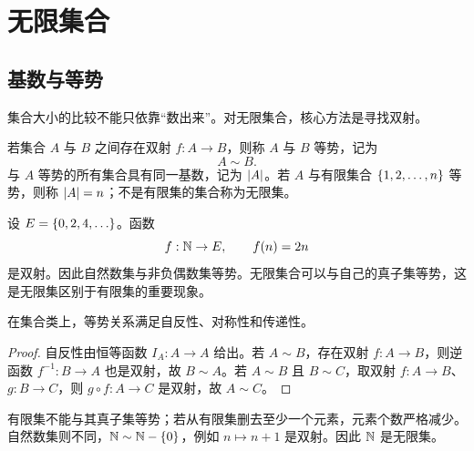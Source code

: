%
%

\chapter{无限集合}

\section{基数与等势}

集合大小的比较不能只依靠“数出来”。对无限集合，核心方法是寻找双射。

\begin{definition}[等势与基数]\label{cardinal-basic}
  若集合 $A$ 与 $B$ 之间存在双射 $f:A\to B$，则称 $A$ 与 $B$ 等势，记为
  \[
  A\sim B.
  \]
  与 $A$ 等势的所有集合具有同一基数，记为 $\lvert A\rvert$。若 $A$ 与有限集合 $\{1,2,\ldots,n\}$ 等势，则称 $\lvert A\rvert=n$；不是有限集的集合称为无限集。
\end{definition}

\begin{example}[title={自然数与偶数等势}]\label{naturals-even}
  设 $E=\{0,2,4,\ldots\}$。函数
  \[
  f:\mathbb{N}\to E,\qquad f(n)=2n
  \]
  是双射。因此自然数集与非负偶数集等势。无限集合可以与自己的真子集等势，这是无限集区别于有限集的重要现象。
\end{example}

\begin{theorem}[等势是等价关系]\label{equinumerous-equivalence}
  在集合类上，等势关系满足自反性、对称性和传递性。
\end{theorem}

\begin{proof}
  自反性由恒等函数 $I_A:A\to A$ 给出。若 $A\sim B$，存在双射 $f:A\to B$，则逆函数 $f^{-1}:B\to A$ 也是双射，故 $B\sim A$。若 $A\sim B$ 且 $B\sim C$，取双射 $f:A\to B$、$g:B\to C$，则 $g\circ f:A\to C$ 是双射，故 $A\sim C$。
\end{proof}

有限集不能与其真子集等势；若从有限集删去至少一个元素，元素个数严格减少。自然数集则不同，$\mathbb{N}\sim\mathbb{N}-\{0\}$，例如 $n\mapsto n+1$ 是双射。因此 $\mathbb{N}$ 是无限集。

